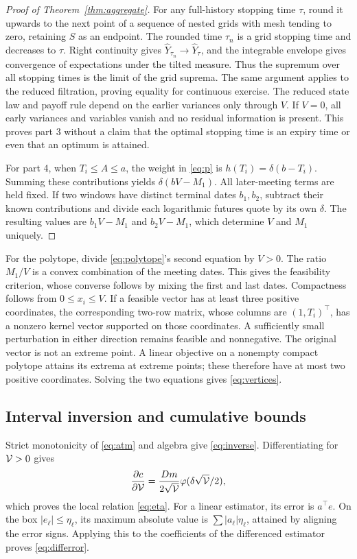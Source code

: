 \begin{proof}[Proof of Theorem~\ref{thm:aggregate}]
For any full-history stopping time $\tau$, round it upwards to the next point of a sequence of nested grids with mesh tending to zero, retaining $S$ as an endpoint. The rounded time $\tau_n$ is a grid stopping time and decreases to $\tau$. Right continuity gives $\widehat Y_{\tau_n}\to \widehat Y_\tau$, and the integrable envelope gives convergence of expectations under the tilted measure. Thus the supremum over all stopping times is the limit of the grid suprema. The same argument applies to the reduced filtration, proving equality for continuous exercise. The reduced state law and payoff rule depend on the earlier variances only through $V$. If $V=0$, all early variances and variables vanish and no residual information is present. This proves part 3 without a claim that the optimal stopping time is an expiry time or even that an optimum is attained.

For part 4, when $T_i\leq A\leq a$, the weight in \eqref{eq:p} is $h(T_i)=\delta(b-T_i)$. Summing these contributions yields $\delta(bV-M_1)$. All later-meeting terms are held fixed. If two windows have distinct terminal dates $b_1,b_2$, subtract their known contributions and divide each logarithmic futures quote by its own $\delta$. The resulting values are $b_1V-M_1$ and $b_2V-M_1$, which determine $V$ and $M_1$ uniquely.
\end{proof}

For the polytope, divide \eqref{eq:polytope}'s second equation by $V>0$. The ratio $M_1/V$ is a convex combination of the meeting dates. This gives the feasibility criterion, whose converse follows by mixing the first and last dates. Compactness follows from $0\leq x_i\leq V$. If a feasible vector has at least three positive coordinates, the corresponding two-row matrix, whose columns are $(1,T_i)^\top$, has a nonzero kernel vector supported on those coordinates. A sufficiently small perturbation in either direction remains feasible and nonnegative. The original vector is not an extreme point. A linear objective on a nonempty compact polytope attains its extrema at extreme points; these therefore have at most two positive coordinates. Solving the two equations gives \eqref{eq:vertices}.

\subsection{Interval inversion and cumulative bounds}
Strict monotonicity of \eqref{eq:atm} and algebra give \eqref{eq:inverse}. Differentiating for $\mathcal V>0$ gives
\[
\frac{\partial c}{\partial \mathcal V}=\frac{Dm}{2\sqrt{\mathcal V}}
                         \varphi(\delta\sqrt{\mathcal V}/2),
\]
which proves the local relation \eqref{eq:eta}. For a linear estimator, its error is $a^\top e$. On the box $|e_\ell|\leq\eta_\ell$, its maximum absolute value is $\sum|a_\ell|\eta_\ell$, attained by aligning the error signs. Applying this to the coefficients of the differenced estimator proves \eqref{eq:differror}.

